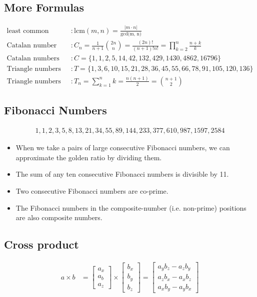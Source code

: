 \documentclass[a4paper, twocolumn]{article}
\begin{document}
\subsection*{More Formulas}
\vspace{-1.5em}
\begin{align*}
\text{least common multiple} &: \text{lcm}(m, n) = \frac{|m \cdot
	n|}{\text{gcd(m, n)}} \\
\text{Catalan number} &: C_n = \frac{1}{n+1}{2n \choose n} =
\frac{(2n)!}{(n+1)!n!} = \prod^n_{k=2}\frac{n+k}{k} \\
\text{Catalan numbers} &: C = \{1, 1, 2, 5, 14, 42, 132, 429, 1430, 4862,
16796\} \\
\text{Triangle numbers} &: T = \{1, 3, 6, 10, 15, 21, 28, 36, 45, 55, 66, 78,
91, 105, 120, 136\} \\
\text{Triangle numbers} &: T_n = \sum_{k=1}^nk = \frac{n(n+1)}{2} = {n+1 \choose
	2}
\end{align*}
\vspace{-1em}
\newpage
\subsection*{Fibonacci Numbers}\vspace*{-1em}
\begin{align*}
1,1,2,3,5,8,13,21,34,55,89, 144, 233, 377, 610, 987, 1597, 2584
\end{align*}
\begin{itemize}
	\item  When we take a pairs of large consecutive Fibonacci numbers, we can
	approximate the golden ratio by dividing them.
	\item The sum of any ten consecutive Fibonacci numbers is divisible by 11.
	\item Two consecutive Fibonacci numbers are co-prime.
	\item The Fibonacci numbers in the composite-number (i.e. non-prime)
	positions are also composite numbers.
\end{itemize}
\subsection*{Cross product}\vspace{-2.5em}
\begin{align*}
a \times b &= \begin{bmatrix} a_x \\ a_b \\ a_z \end{bmatrix}
\times \begin{bmatrix} b_x \\ b_y \\ b_z \end{bmatrix} =
\begin{bmatrix} a_yb_z - a_zb_y \\ a_zb_x - a_xb_z \\ 
a_xb_y - a_yb_x \end{bmatrix}
\end{align*}
\end{document}

